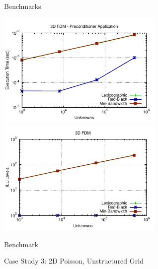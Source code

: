 \begin{frame}{Benchmarks}
  \begin{center}
   \vspace*{-0.4cm}
   \includegraphics[width=0.60\textwidth]{figures/fdm3d-precond.pdf} \\[-0.2em]
   \includegraphics[width=0.60\textwidth]{figures/fdm3d-levels.pdf}
  \end{center}
\end{frame}


\begin{frame}{Benchmark}
 \begin{center}
  Case Study 3: 2D Poisson, Unstructured Grid
 \end{center}
\end{frame}

